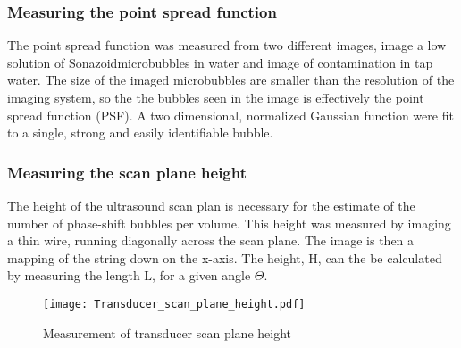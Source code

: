 \subsubsection{Measuring the point spread function}
The point spread function was measured from two different images, image a low solution of Sonazoid\texttrademark microbubbles in water and image of contamination in tap water. The size of the imaged microbubbles are smaller than the resolution of the imaging system, so the the bubbles seen in the image is effectively the point spread function (PSF). A two dimensional, normalized Gaussian function were fit to a single, strong and easily identifiable bubble. 

 
\subsubsection{Measuring the scan plane height}
The height of the ultrasound scan plan is necessary for the estimate of the number of phase-shift bubbles per volume. This height was measured by imaging a thin wire, running diagonally across the scan plane. The image is then a mapping of the string down on the x-axis. The height, H,  can the be calculated by measuring the length L, for a given angle $\Theta$.

\begin{figure}[h]
  \centering
  \texttt{[image: Transducer\_scan\_plane\_height.pdf]}
  \caption{Measurement of transducer scan plane height}
\end{figure}





